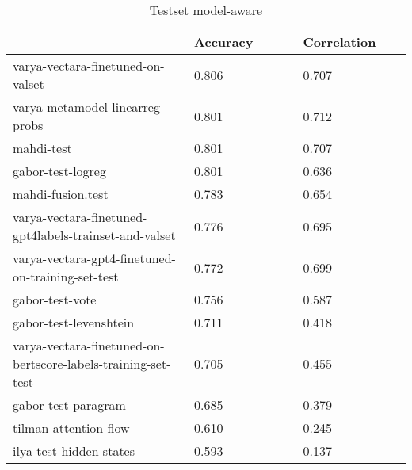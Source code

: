 \begin{table}
\centering
\caption{Testset model-aware}
\label{test-aware}
\begin{tabular}{|p{0.45\linewidth}|R{0.275\linewidth}|R{0.275\linewidth}|}
\hline
 & Accuracy & Correlation \\
\hline
varya-vectara-finetuned-on-valset & 0.806 & 0.707 \\
varya-metamodel-linearreg-probs & 0.801 & 0.712 \\
mahdi-test & 0.801 & 0.707 \\
gabor-test-logreg & 0.801 & 0.636 \\
mahdi-fusion.test & 0.783 & 0.654 \\
varya-vectara-finetuned-gpt4labels-trainset-and-valset & 0.776 & 0.695 \\
varya-vectara-gpt4-finetuned-on-training-set-test & 0.772 & 0.699 \\
gabor-test-vote & 0.756 & 0.587 \\
gabor-test-levenshtein & 0.711 & 0.418 \\
varya-vectara-finetuned-on-bertscore-labels-training-set-test & 0.705 & 0.455 \\
gabor-test-paragram & 0.685 & 0.379 \\
tilman-attention-flow & 0.610 & 0.245 \\
ilya-test-hidden-states & 0.593 & 0.137 \\
\hline
\end{tabular}
\end{table}
